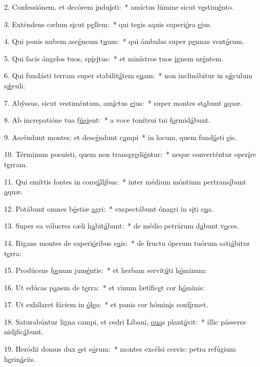 2. Confessiónem, et decórem \uline{i}ndu\uline{í}sti:~* amíctus lúmine sicut v\uline{e}stim\uline{é}nto.\par 
3. Exténdens cælum s\uline{i}cut p\uline{e}llem:~* qui tegis aquis superi\uline{ó}ra \uline{e}jus.\par 
4. Qui ponis nubem asc\uline{é}nsum t\uline{u}um:~* qui ámbulas super p\uline{e}nnas vent\uline{ó}rum.\par 
5. Qui facis ángelos tuos, sp\uline{í}r\uline{i}tus:~* et minístros tuos \uline{i}gnem ur\uline{é}ntem.\par 
6. Qui fundásti terram super stabilit\uline{á}tem s\uline{u}am:~* non inclinábitur in s\uline{ǽ}culum s\uline{ǽ}culi.\par 
7. Abýssus, sicut vestiméntum, am\uline{í}ctus \uline{e}jus:~* super montes st\uline{a}bunt \uline{a}quæ.\par 
8. Ab increpatióne tua f\uline{ú}g\uline{i}ent:~* a voce tonítrui tui f\uline{o}rmid\uline{á}bunt.\par 
9. Ascéndunt montes: et desc\uline{é}ndunt c\uline{a}mpi~* in locum, quem fund\uline{á}sti \uline{e}is.\par 
10. Términum posuísti, quem non transgr\uline{e}di\uline{é}ntur:~* neque converténtur oper\uline{í}re t\uline{e}rram.\par 
11. Qui emíttis fontes in conv\uline{á}ll\uline{i}bus:~* inter médium móntium pertrans\uline{í}bunt \uline{a}quæ.\par 
12. Potábunt omnes b\uline{é}stiæ \uline{a}gri:~* exspectábunt ónagri in s\uline{i}ti s\uline{u}a.\par 
13. Super ea vólucres cæli h\uline{a}bit\uline{á}bunt:~* de médio petrárum d\uline{a}bunt v\uline{o}ces.\par 
14. Rigans montes de superi\uline{ó}ribus s\uline{u}is:~* de fructu óperum tuórum sati\uline{á}bitur t\uline{e}rra:\par 
15. Prodúcens f\uline{œ}num jum\uline{é}ntis:~* et herbam servit\uline{ú}ti h\uline{ó}minum:\par 
16. Ut edúcas p\uline{a}nem de t\uline{e}rra:~* et vinum lætífic\uline{e}t cor h\uline{ó}minis:\par 
17. Ut exhílaret fáciem in \uline{ó}l\uline{e}o:~* et panis cor hómin\uline{i}s conf\uline{í}rmet.\par 
18. Saturabúntur ligna campi, et cedri Líbani, \uline{qua}s plant\uline{á}vit:~* illic pásseres nid\uline{i}fic\uline{á}bunt.\par 
19. Heródii domus dux \uline{e}st e\uline{ó}rum:~* montes excélsi cervis: petra refúgium h\uline{e}rin\uline{á}ciis.\par 
